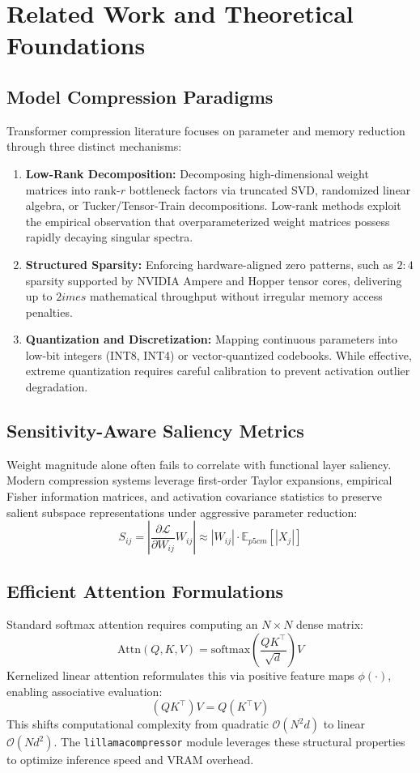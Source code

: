 \section{Related Work and Theoretical Foundations}

\subsection{Model Compression Paradigms}
Transformer compression literature focuses on parameter and memory reduction through three distinct mechanisms:
\begin{enumerate}
\item \textbf{Low-Rank Decomposition:} Decomposing high-dimensional weight matrices into rank-$r$ bottleneck factors via truncated SVD, randomized linear algebra, or Tucker/Tensor-Train decompositions. Low-rank methods exploit the empirical observation that overparameterized weight matrices possess rapidly decaying singular spectra.
\item \textbf{Structured Sparsity:} Enforcing hardware-aligned zero patterns, such as $2:4$ sparsity supported by NVIDIA Ampere and Hopper tensor cores, delivering up to $2	imes$ mathematical throughput without irregular memory access penalties.
\item \textbf{Quantization and Discretization:} Mapping continuous parameters into low-bit integers (INT8, INT4) or vector-quantized codebooks. While effective, extreme quantization requires careful calibration to prevent activation outlier degradation.
\end{enumerate}

\subsection{Sensitivity-Aware Saliency Metrics}
Weight magnitude alone often fails to correlate with functional layer saliency. Modern compression systems leverage first-order Taylor expansions, empirical Fisher information matrices, and activation covariance statistics to preserve salient subspace representations under aggressive parameter reduction:
\[
S_{ij} = \left| \frac{\partial \mathcal{L}}{\partial W_{ij}} W_{ij} \right| \approx |W_{ij}| \cdot \mathbb{E}_{p{5cm}}[|X_j|]
\]

\subsection{Efficient Attention Formulations}
Standard softmax attention requires computing an $N \times N$ dense matrix:
\[
\text{Attn}(Q, K, V) = \text{softmax}\left(\frac{Q K^\top}{\sqrt{d}}\right) V
\]
Kernelized linear attention reformulates this via positive feature maps $\phi(\cdot)$, enabling associative evaluation:
\[
(Q K^\top) V = Q (K^\top V)
\]
This shifts computational complexity from quadratic $\mathcal{O}(N^2 d)$ to linear $\mathcal{O}(N d^2)$. The \texttt{lillamacompressor} module leverages these structural properties to optimize inference speed and VRAM overhead.
